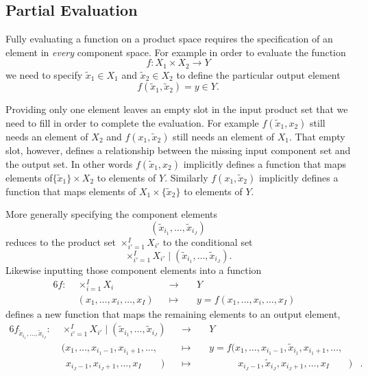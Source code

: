 \documentclass[
  letterpaper,
  DIV=11,
  numbers=noendperiod]{scrartcl}
\begin{document}
\hypertarget{partial-evaluation}{%
\subsection{Partial Evaluation}\label{partial-evaluation}}

Fully evaluating a function on a product space requires the
specification of an element in \emph{every} component space. For example
in order to evaluate the function \[
f: X_{1} \times X_{2} \rightarrow Y
\] we need to specify \(\tilde{x}_{1} \in X_{1}\) and
\(\tilde{x}_{2} \in X_{2}\) to define the particular output element \[
f(\tilde{x}_{1}, \tilde{x}_{2}) = y \in Y.
\]

Providing only one element leaves an empty slot in the input product set
that we need to fill in order to complete the evaluation. For example
\(f(\tilde{x}_{1}, x_{2})\) still needs an element of \(X_{2}\) and
\(f(x_{1}, \tilde{x}_{2})\) still needs an element of \(X_{1}\). That
empty slot, however, defines a relationship between the missing input
component set and the output set. In other words
\(f(\tilde{x}_{1}, x_{2})\) implicitly defines a function that maps
elements of\(\{ \tilde{x}_{1} \} \times X_{2}\) to elements of \(Y\).
Similarly \(f(x_{1}, \tilde{x}_{2})\) implicitly defines a function that
maps elements of \(X_{1} \times \{ \tilde{x}_{2} \}\) to elements of
\(Y\).

More generally specifying the component elements \[
( \tilde{x}_{i_{1}}, \ldots, \tilde{x}_{i_{J}} )
\] reduces to the product set \(\times_{i' = 1}^{I} X_{i'}\) to the
conditional set \[
\times_{i' = 1}^{I} X_{i'} \mid (\tilde{x}_{i_{1}}, \ldots, \tilde{x}_{i_{J}}).
\] Likewise inputting those component elements into a function
\begin{alignat*}{6}
f :\; & \times_{i = 1}^{I} X_{i} & &\rightarrow& \; & Y &
\\
& (x_{1}, \ldots, x_{i}, \ldots, x_{I}) & &\mapsto&
& y = f(x_{1}, \ldots, x_{i}, \ldots, x_{I}) &
\end{alignat*} defines a new function that maps the remaining elements
to an output element, \begin{alignat*}{6}
f_{ \tilde{x}_{i_{1}}, \ldots, \tilde{x}_{i_{J}} } :\; &
\times_{i' = 1}^{I} X_{i'} \mid (\tilde{x}_{i_{1}}, \ldots, \tilde{x}_{i_{J}}) &
&\rightarrow& \; & Y &
\\
& (x_{1}, \ldots, x_{i_{1} - 1}, x_{i_{1} + 1}, \ldots, & &\mapsto&
& y = f(x_{1}, \ldots, x_{i_{1} - 1}, \tilde{x}_{i_{1}}, x_{i_{1} + 1}, \ldots, &
\\
& \;\, x_{i_{J} - 1}, x_{i_{J} + 1}, \ldots, x_{I} \quad\quad) & &\mapsto&
& \quad\quad\quad x_{i_{J} - 1}, \tilde{x}_{i_{J}}, x_{i_{J} + 1}, \ldots, x_{I} \quad\quad) &.
\end{alignat*}
\end{document}
